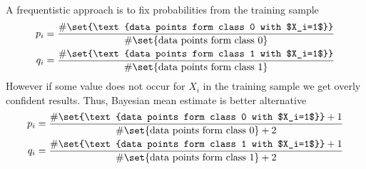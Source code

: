 \documentclass[landscape,footrule]{foils}
\begin{document}
A frequentistic approach is to fix probabilities from the training sample
\begin{align*}
p_i&=\frac{\#\set{\text{data points form class 0 with $X_i=1$}}}{\#\set{\text{data points form class 0}}}\\
q_i&=\frac{\#\set{\text{data points form class 1 with $X_i=1$}}}{\#\set{\text{data points form class 1}}}
\end{align*}
However if some value does not occur for $X_i$ in the training sample we get overly confident results. Thus, Bayesian mean estimate is better alternative  
\begin{align*}
p_i&=\frac{\#\set{\text{data points form class 0 with $X_i=1$}}+1}{\#\set{\text{data points form class 0}}+2}\\
q_i&=\frac{\#\set{\text{data points form class 1 with $X_i=1$}}+1}{\#\set{\text{data points form class 1}}+2}
\end{align*}
\end{document}

